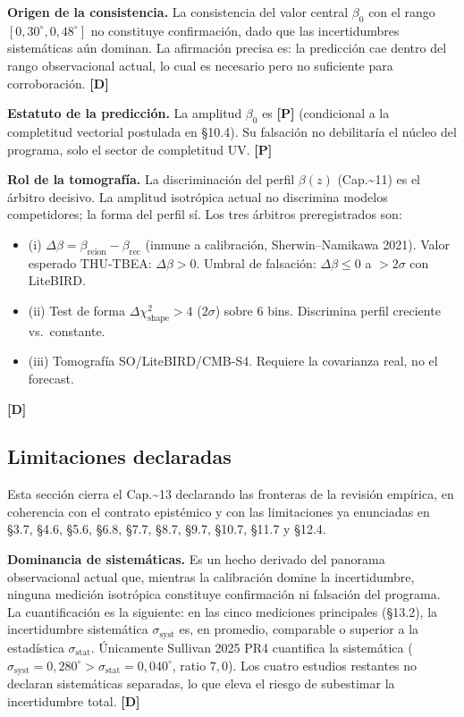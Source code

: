 ﻿\documentclass[11pt,letterpaper]{article}
\begin{document}
\textbf{Origen de la consistencia.} La consistencia del valor central $\beta_0$ con el rango $[0{,}30^\circ, 0{,}48^\circ]$ no constituye confirmación, dado que las incertidumbres sistemáticas aún dominan. La afirmación precisa es: la predicción cae dentro del rango observacional actual, lo cual es necesario pero no suficiente para corroboración. \textbf{[D]}

\textbf{Estatuto de la predicción.} La amplitud $\beta_0$ es \textbf{[P]} (condicional a la completitud vectorial postulada en §10.4). Su falsación no debilitaría el núcleo del programa, solo el sector de completitud UV. \textbf{[P]}

\textbf{Rol de la tomografía.} La discriminación del perfil $\beta(z)$ (Cap.\textasciitilde{}11) es el árbitro decisivo. La amplitud isotrópica actual no discrimina modelos competidores; la forma del perfil sí. Los tres árbitros preregistrados son:

\begin{itemize}[leftmargin=*]
\item (i) $\Delta\beta = \beta_{\text{reion}} - \beta_{\text{rec}}$ (inmune a calibración, Sherwin--Namikawa 2021). Valor esperado THU-TBEA: $\Delta\beta > 0$. Umbral de falsación: $\Delta\beta \leq 0$ a $> 2\sigma$ con LiteBIRD.
\item (ii) Test de forma $\Delta\chi^2_{\text{shape}} > 4$ ($2\sigma$) sobre $6$ bins. Discrimina perfil creciente vs.\ constante.
\item (iii) Tomografía SO/LiteBIRD/CMB-S4. Requiere la covarianza real, no el forecast.
\end{itemize}

\textbf{[D]}
\subsection{Limitaciones declaradas}
Esta sección cierra el Cap.\textasciitilde{}13 declarando las fronteras de la revisión empírica, en coherencia con el contrato epistémico y con las limitaciones ya enunciadas en §3.7, §4.6, §5.6, §6.8, §7.7, §8.7, §9.7, §10.7, §11.7 y §12.4.

\textbf{Dominancia de sistemáticas.} Es un hecho derivado del panorama observacional actual que, mientras la calibración domine la incertidumbre, ninguna medición isotrópica constituye confirmación ni falsación del programa. La cuantificación es la siguiente: en las cinco mediciones principales (§13.2), la incertidumbre sistemática $\sigma_{\text{syst}}$ es, en promedio, comparable o superior a la estadística $\sigma_{\text{stat}}$. Únicamente Sullivan 2025 PR4 cuantifica la sistemática ($\sigma_{\text{syst}} = 0{,}280^\circ > \sigma_{\text{stat}} = 0{,}040^\circ$, ratio $7{,}0$). Los cuatro estudios restantes no declaran sistemáticas separadas, lo que eleva el riesgo de subestimar la incertidumbre total. \textbf{[D]}
\end{document}
